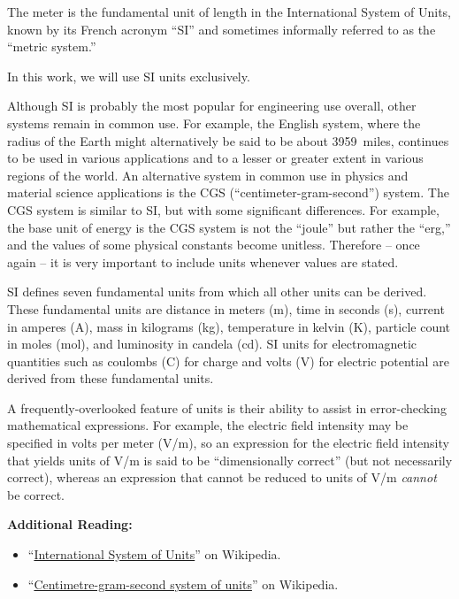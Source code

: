 The meter is the fundamental unit of length in the International System of Units, known by its French acronym ``SI'' 
and sometimes informally referred to as the ``metric system.''  

\begin{mdframed}[backgroundcolor=yellow!20,nobreak=true] 
In this work, we will use SI units exclusively.
\end{mdframed}

Although SI is probably the most popular for engineering use overall, other systems remain in common use.  
For example, the English system, 
where the radius of the Earth might alternatively be said to be about 3959~miles, continues to be used in various applications and to a lesser or greater extent in various regions of the world.
An alternative system in common use in physics and material science applications is the CGS
(``centimeter-gram-second'') system. The CGS system is similar to SI, but with some significant differences. For example, the base unit of energy is the CGS system is not the ``joule'' but rather the ``erg,'' and the values of some physical constants become unitless. Therefore -- once again -- it is very important to include units whenever values are stated.

SI defines seven fundamental units from which all other units can be derived.  These fundamental units are
distance in meters (m),
time in seconds (s), 
current in amperes (A),
mass in kilograms (kg),
temperature in kelvin (K),
particle count in moles (mol), and
luminosity in candela (cd).
SI units for electromagnetic quantities such as coulombs (C) for charge and volts (V) for electric potential are derived from these fundamental units.

A frequently-overlooked feature of units is their ability to assist in error-checking mathematical expressions.
For example, the electric field intensity may be specified in volts per meter (V/m), so an expression for the electric field intensity that yields units of V/m is said to be ``dimensionally correct'' (but not necessarily correct), whereas an expression that cannot be reduced to units of V/m \emph{cannot} be correct. 


{\bf Additional Reading:}
\begin{itemize}
\item ``\href{https://en.wikipedia.org/wiki/International_System_of_Units}{International System of Units}'' on Wikipedia.
\item ``\href{https://en.wikipedia.org/wiki/Centimetre-gram-second_system_of_units}{Centimetre-gram-second system of units}'' on Wikipedia.
\end{itemize}


